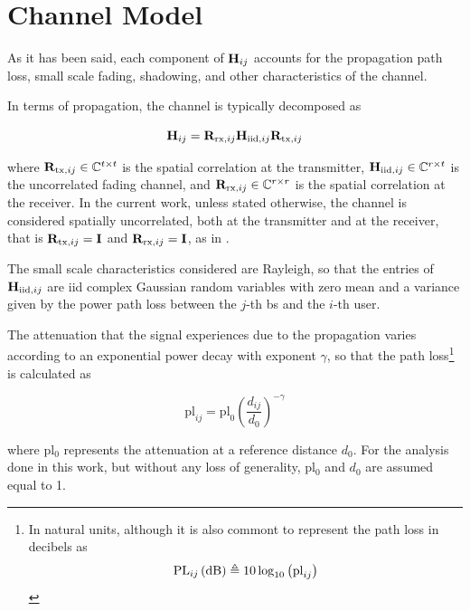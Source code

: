 \section{Channel Model}\label{sec:channel_model}
As it has been said, each component of $\mathbf{H}_{ij}$ accounts for the propagation
path loss, small scale fading, shadowing, and other characteristics of the
channel.

In terms of propagation, the channel is typically decomposed as

\begin{equation} \label{eq:propagation_decomp}
    \mathbf{H}_{ij} = \mathbf{R}_{\text{rx}, ij} \mathbf{H}_{\text{iid},ij} \mathbf{R}_{\text{tx}, ij}
\end{equation}

\noindent
where $\mathbf{R}_{\text{tx}, ij} \in \mathbb{C}^{t \times t}$ is the spatial correlation at
the transmitter, $\mathbf{H}_{\text{iid},ij} \in \mathbb{C}^{r \times t}$ is the uncorrelated
fading channel, and $\mathbf{R}_{\text{rx}, ij} \in \mathbb{C}^{r \times r}$ is the spatial
correlation at the receiver. In the current work, unless stated otherwise, the
channel is considered spatially uncorrelated, both at the transmitter and at the
receiver, that is $\mathbf{R}_{\text{tx}, ij} = \mathbf{I}$ and $\mathbf{R}_{\text{rx}, ij} = \mathbf{I}$,
as in \cite{karakayali06}.

The small scale characteristics considered are Rayleigh, so that the entries of
$\mathbf{H}_{\text{iid},ij}$ are \gls{iid} complex Gaussian random variables with zero
mean and a variance given by the power path loss between the $j$-th \gls{bs} and
the $i$-th user.

The attenuation that the signal experiences due to the propagation varies
according to an exponential power decay with exponent $\gamma$, so that the path
loss\footnote{
    In natural units, although it is also commont to represent the path loss in
    decibels as
    \begin{equation} \label{eq:path_loss_db}
        \text{PL}_{ij}\left(\text{dB}\right) \triangleq 10 \log_{10} \left(
        \text{pl}_{ij} \right)
    \end{equation}
} is calculated as

\begin{equation} \label{eq:path_loss}
    \text{pl}_{ij} = \text{pl}_0 \left( \frac{d_{ij}}{d_0}\right)^{-\gamma}
\end{equation}

\noindent
where pl$_0$ represents the attenuation at a reference distance $d_0$. For the
analysis done in this work, but without any loss of generality, pl$_0$ and $d_0$
are assumed equal to 1.

